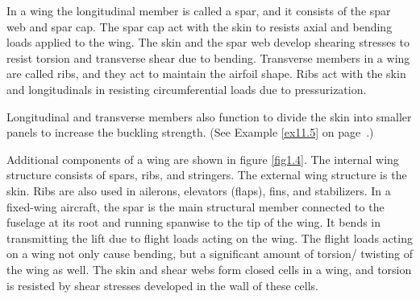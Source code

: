 \documentclass{AeroStructure-ERJohnson}
\begin{document}
In a wing the longitudinal member is called a spar, and it consists of the
spar web and spar cap. The spar cap act with the skin to resists axial and
bending loads applied to the wing. The skin and the spar web develop
shearing stresses to resist torsion and transverse shear due to bending.
Transverse members in a wing are called ribs, and they act to maintain the
airfoil shape. Ribs act with the skin and longitudinals in resisting
circumferential loads due to pressurization.

Longitudinal and transverse members also function to divide the skin into
smaller panels to increase the buckling strength. (See Example \ref{ex11.5} on
page~\pageref{ex11.5}.)




Additional components of a wing are shown in figure \ref{fig1.4}. The internal wing structure consists of spars, ribs, and stringers. The
external wing structure is the skin. Ribs are also used in ailerons,
elevators (flaps), fins, and stabilizers. In a fixed-wing aircraft, the spar
is the main structural member connected to the fuselage at its root and
running spanwise to the tip of the wing. It bends in transmitting the lift
due to flight loads acting on the wing. The flight loads acting on a wing
not only cause bending, but a significant amount of torsion/ twisting of the
wing as well. The skin and shear webs form closed cells in a wing, and
torsion is resisted by shear stresses developed in the wall of these cells.

{\def\thefigure{1.4}
}
\end{document}
